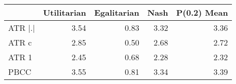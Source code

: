 \begin{tabular}{lrrrr}
\toprule
 & Utilitarian & Egalitarian & Nash & P(0.2) Mean \\
\midrule
ATR |.| & 3.54 & 0.83 & 3.32 & 3.36 \\
ATR c & 2.85 & 0.50 & 2.68 & 2.72 \\
ATR 1 & 2.45 & 0.68 & 2.28 & 2.32 \\
PBCC & 3.55 & 0.81 & 3.34 & 3.39 \\
\bottomrule
\end{tabular}
